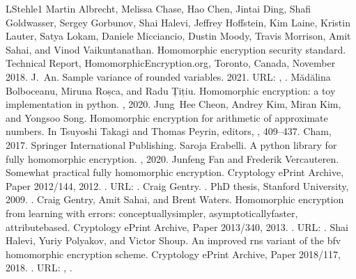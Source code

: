 \documentclass[letterpaper,10pt,english]{jupyterBook}
\begin{document}
\begin{sphinxthebibliography}{LStehle1}
\sphinxAtStartPar
Martin Albrecht, Melissa Chase, Hao Chen, Jintai Ding, Shafi Goldwasser, Sergey Gorbunov, Shai Halevi, Jeffrey Hoffstein, Kim Laine, Kristin Lauter, Satya Lokam, Daniele Micciancio, Dustin Moody, Travis Morrison, Amit Sahai, and Vinod Vaikuntanathan. Homomorphic encryption security standard. Technical Report, HomomorphicEncryption.org, Toronto, Canada, November 2018.
\sphinxAtStartPar
J. An. Sample variance of rounded variables. 2021. URL: , .
\sphinxAtStartPar
Mădălina Bolboceanu, Miruna Roșca, and Radu Țițiu. Homomorphic encryption: a toy implementation in python. , 2020.
\sphinxAtStartPar
Jung Hee Cheon, Andrey Kim, Miran Kim, and Yongsoo Song. Homomorphic encryption for arithmetic of approximate numbers. In Tsuyoshi Takagi and Thomas Peyrin, editors, , 409–437. Cham, 2017. Springer International Publishing.
\sphinxAtStartPar
Saroja Erabelli. A python library for fully homomorphic encryption. , 2020.
\sphinxAtStartPar
Junfeng Fan and Frederik Vercauteren. Somewhat practical fully homomorphic encryption. Cryptology ePrint Archive, Paper 2012/144, 2012. . URL: .
\sphinxAtStartPar
Craig Gentry. . PhD thesis, Stanford University, 2009. .
\sphinxAtStartPar
Craig Gentry, Amit Sahai, and Brent Waters. Homomorphic encryption from learning with errors: conceptually\sphinxhyphen{}simpler, asymptotically\sphinxhyphen{}faster, attribute\sphinxhyphen{}based. Cryptology ePrint Archive, Paper 2013/340, 2013. . URL: .
\sphinxAtStartPar
Shai Halevi, Yuriy Polyakov, and Victor Shoup. An improved rns variant of the bfv homomorphic encryption scheme. Cryptology ePrint Archive, Paper 2018/117, 2018. . URL: , .

\end{sphinxthebibliography}
\end{document}
